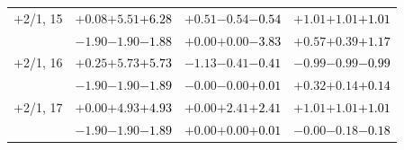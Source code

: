 \documentclass[compress]{beamer}
\begin{document}
\begin{frame}
\begin{tabular}{r | c | c | c}
$+$2/1, 15 & $+0.08$\hspace{0.1 cm}$+5.51$\hspace{0.1 cm}\textcolor{black}{$+6.28$} & $+0.51$\hspace{0.1 cm}$-0.54$\hspace{0.1 cm}\textcolor{black}{$-0.54$} & $+1.01$\hspace{0.1 cm}$+1.01$\hspace{0.1 cm}\textcolor{black}{$+1.01$} \\
           & $-1.90$\hspace{0.1 cm}$-1.90$\hspace{0.1 cm}\textcolor{black}{$-1.88$} & $+0.00$\hspace{0.1 cm}$+0.00$\hspace{0.1 cm}\textcolor{black}{$-3.83$} & $+0.57$\hspace{0.1 cm}$+0.39$\hspace{0.1 cm}\textcolor{black}{$+1.17$} \\
$+$2/1, 16 & $+0.25$\hspace{0.1 cm}$+5.73$\hspace{0.1 cm}\textcolor{black}{$+5.73$} & $-1.13$\hspace{0.1 cm}$-0.41$\hspace{0.1 cm}\textcolor{black}{$-0.41$} & $-0.99$\hspace{0.1 cm}$-0.99$\hspace{0.1 cm}\textcolor{black}{$-0.99$} \\
           & $-1.90$\hspace{0.1 cm}$-1.90$\hspace{0.1 cm}\textcolor{black}{$-1.89$} & $-0.00$\hspace{0.1 cm}$-0.00$\hspace{0.1 cm}\textcolor{black}{$+0.01$} & $+0.32$\hspace{0.1 cm}$+0.14$\hspace{0.1 cm}\textcolor{black}{$+0.14$} \\
$+$2/1, 17 & $+0.00$\hspace{0.1 cm}$+4.93$\hspace{0.1 cm}\textcolor{black}{$+4.93$} & $+0.00$\hspace{0.1 cm}$+2.41$\hspace{0.1 cm}\textcolor{black}{$+2.41$} & $+1.01$\hspace{0.1 cm}$+1.01$\hspace{0.1 cm}\textcolor{black}{$+1.01$} \\
           & $-1.90$\hspace{0.1 cm}$-1.90$\hspace{0.1 cm}\textcolor{black}{$-1.89$} & $+0.00$\hspace{0.1 cm}$+0.00$\hspace{0.1 cm}\textcolor{black}{$+0.01$} & $-0.00$\hspace{0.1 cm}$-0.18$\hspace{0.1 cm}\textcolor{black}{$-0.18$} \\

\end{tabular}
\end{frame}
\end{document}
